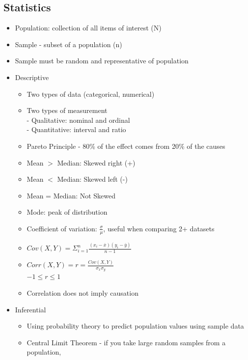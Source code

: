 \documentclass{article}
\begin{document}
\begin{multicols*}{3}
        \section{Statistics}
    \renewcommand\labelitemi{{\boldmath$\cdot$}}
    \begin{itemize}[noitemsep]
        \item Population: collection of all items of interest (N)
        \item Sample - subset of a population (n)
        \item Sample must be random and representative of population
        \item Descriptive
        \begin{itemize}
            \item Two types of data (categorical, numerical)
            \item Two types of measurement \\
            - Qualitative: nominal and ordinal \\
            - Quantitative: interval and ratio \\
            \item Pareto Principle - 80\% of the effect comes from 20\% of the causes
            \item Mean $>$ Median: Skewed right (+)
            \item Mean $<$ Median: Skewed left (-)
            \item Mean = Median: Not Skewed
            \item Mode: peak of distribution
            \item Coefficient of variation: $\frac{\sigma}{\mu}$, useful when 
            comparing 2+ datasets
            \item $Cov(X,Y) = \Sigma_{i=1}^{n}\frac{(x_i-\overline{x})(y_i-\overline{y})}{n-1}$
            \item $Corr(X,Y) = r = \frac{Cov(X,Y)}{\sigma_x\sigma_y}$ \\
            $-1 \leq r \leq 1$
            \item Correlation does not imply causation
        \end{itemize}
        \item Inferential
        \begin{itemize}
            \item Using probability theory to predict population values using sample data
            \item Central Limit Theorem - if you take large random samples from a population, 

\end{itemize}
\end{itemize}
\end{multicols*}
\end{document}
